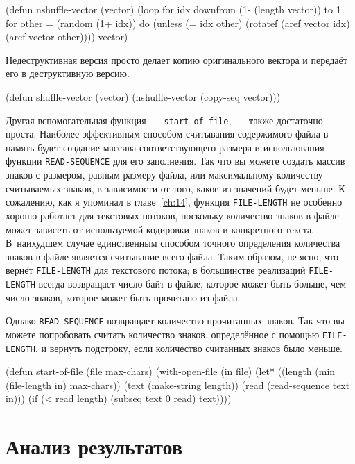 \begin{myverb}
(defun nshuffle-vector (vector)
  (loop for idx downfrom (1- (length vector)) to 1
        for other = (random (1+ idx))
        do (unless (= idx other)
             (rotatef (aref vector idx) (aref vector other))))
  vector)
\end{myverb}

Недеструктивная версия просто делает копию оригинального вектора и передаёт его в
деструктивную версию.

\begin{myverb}
(defun shuffle-vector (vector)
  (nshuffle-vector (copy-seq vector)))
\end{myverb}

Другая вспомогательная функция~--- \lstinline{start-of-file},~--- также достаточно проста.
Наиболее эффективным способом считывания содержимого файла в память будет создание
массива соответствующего размера и использования функции \lstinline{READ-SEQUENCE} для его
заполнения.  Так что вы можете создать массив знаков с размером, равным размеру файла, или
максимальному количеству считываемых знаков, в зависимости от того, какое из значений
будет меньше.  К сожалению, как я упоминал в главе~\ref{ch:14}, функция \lstinline{FILE-LENGTH}
не особенно хорошо работает для текстовых потоков, поскольку количество знаков в файле
может зависеть от используемой кодировки знаков и конкретного текста.  В~наихудшем случае
единственным способом точного определения количества знаков в файле является считывание
всего файла.  Таким образом, не ясно, что вернёт \lstinline{FILE-LENGTH} для текстового потока; в
большинстве реализаций \lstinline{FILE-LENGTH} всегда возвращает число байт в файле, которое
может быть больше, чем число знаков, которое может быть прочитано из файла.

Однако \lstinline{READ-SEQUENCE} возвращает количество прочитанных знаков.  Так что вы можете
попробовать считать количество знаков, определённое с помощью \lstinline{FILE-LENGTH}, и вернуть
подстроку, если количество считанных знаков было меньше.

\begin{myverb}
(defun start-of-file (file max-chars)
  (with-open-file (in file)
    (let* ((length (min (file-length in) max-chars))
           (text (make-string length))
           (read (read-sequence text in)))
      (if (< read length)
        (subseq text 0 read)
        text))))
\end{myverb}


\section{Анализ результатов}


